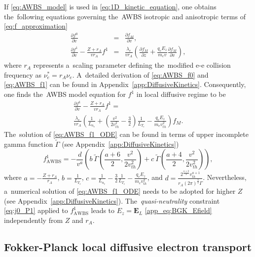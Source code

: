 \documentclass[
 aps,
 jmp,
 amsmath,amssymb,
 twocolumn,
]{revtex4-1}
\newcommand{\appref}[1]{Appendix~\ref{#1}}
\newcommand{\pdv}[2]{\frac{\partial{#1}}{\partial{#2}}}
\newcommand{\vect}[1]{\boldsymbol{#1}}
\newcommand{\mfpe}{\lambda_e}
\newcommand{\Zbar}{Z}
\newcommand{\nue}{\nu_{e}}
\newcommand{\vmag}{v}
\newcommand{\vth}{v_{th}}
\newcommand{\E}{\vect{E}}
\newcommand{\Ez}{E_z}
\newcommand{\qe}{q_e}
\newcommand{\me}{m_e}
\newcommand{\Te}{T_e}
\newcommand{\ed}{n_e}
\newcommand{\fM}{f_M}
\newcommand{\ft}{f}
\begin{document}
If \eqref{eq:AWBS_model} is used in \eqref{eq:1D_kinetic_equation}, one obtains
the~following equations governing the~AWBS isotropic and anisotropic terms of 
\eqref{eq:f_approximation}
\begin{eqnarray}
  \pdv{\ft^0}{\vmag} &=& \pdv{\fM}{\vmag} ,
  \label{eq:AWBS_f0} \\
  \pdv{\ft^1}{\vmag}  
  - \frac{\Zbar +  r_A}{\vmag r_A} \ft^1 &=& 
  \frac{\mfpe}{\vmag r_A}
  \left(\pdv{\fM}{z} + \frac{\qe\Ez}{\me\vmag}\pdv{\fM}{\vmag}\right) ,
  \label{eq:AWBS_f1} 
\end{eqnarray}
where $ r_A$ represents a~scaling parameter defining the~modified
e-e collision frequency as $\nue^* =  r_A \nue$.
A~detailed derivation of \eqref{eq:AWBS_f0} and \eqref{eq:AWBS_f1} 
can be found in Appendix~\ref{app:DiffusiveKinetics}.
Consequently, one finds the~AWBS model equation for $\ft^1$ 
in local diffusive regime to be
\begin{multline}
  \pdv{\ft^1}{\vmag} 
  - \frac{\Zbar +  r_A}{\vmag r_A}\ft^1
  = \\
  \frac{\mfpe}{\vmag r_A}\left(\frac{1}{L_{n_e}} + 
  \left( \frac{\vmag^2}{2 \vth^2} - \frac{3}{2}\right)
  \frac{1}{L_{T_e}} - \frac{\qe\Ez}{\me\vth^2}\right)\fM .
  \label{eq:AWBS_f1_ODE}
\end{multline}
The~solution of \eqref{eq:AWBS_f1_ODE} can be found in terms of 
upper incomplete gamma function $\tilde{\Gamma}$ 
(see \appref{app:DiffusiveKinetics})
\begin{equation}
  \ft^1_{\text{AWBS}} = - \frac{d}{\vmag^a} 
  \left(b~\tilde{\Gamma}{\left(\frac{a+6}{2}, \frac{\vmag^2}{2\vth^2}\right)}
  + c~\tilde{\Gamma}{\left(\frac{a+4}{2}, \frac{\vmag^2}{2\vth^2}\right)}\right)
  ,
  \label{eq:AWBS_analytic_solution}
\end{equation}
where 
$a = -\frac{\Zbar + r_A}{r_A}$, $b = \frac{1}{L_{\Te}}$, 
$c = \frac{1}{L_{\ed}} - \frac{3}{2}\frac{1}{L_{\Te}} 
- \frac{\qe\Ez}{\me\vth^2}$, and
$d = \frac{2^{\frac{a + 2}{2}} \vth^{a + 1}}{r_A (2\pi)^{\frac{3}{2}} \Gamma}$.
Nevertheless, a~numerical solution of \eqref{eq:AWBS_f1_ODE} needs to be 
adopted for higher $\Zbar$  (see \appref{app:DiffusiveKinetics}).
The~\textit{quasi-neutrality} constraint \eqref{eq:j0_P1} applied to
$\ft^1_{\text{AWBS}}$ leads to $\Ez = \E_L$ \eqref{app_eq:BGK_Efield} 
independently from $\Zbar$ and $r_A$. 

\subsection{Fokker-Planck local diffusive electron transport}
\label{sec:FPDiffusiveRegime}
\end{document}
